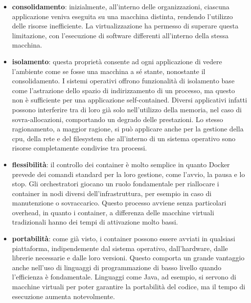 \begin{itemize}
	\item \textbf{consolidamento}: inizialmente, all'interno delle organizzazioni, ciascuna applicazione veniva eseguita su una macchina distinta, rendendo l'utilizzo delle risorse inefficiente. La virtualizzazione ha permesso di superare questa limitazione, con l'esecuzione di software differenti all'interno della stessa macchina.
	\item \textbf{isolamento}: questa proprietà consente ad ogni applicazione di vedere l'ambiente come se fosse una macchina a sé stante, nonostante il consolidamento. I sistemi operativi offrono funzionalità di isolamento base come l'astrazione dello spazio di indirizzamento di un processo, ma questo non è sufficiente per una applicazione self-contained. Diversi applicativi infatti possono interferire tra di loro già solo nell'utilizzo della memoria, nel caso di sovra-allocazioni, comportando un degrado delle prestazioni. Lo stesso ragionamento, a maggior ragione, si può applicare anche per la gestione della cpu, della rete e del filesystem che all'interno di un sistema operativo sono risorse completamente condivise tra processi. 
	\item \textbf{flessibilità}: il controllo dei container è molto semplice in quanto Docker prevede dei comandi standard per la loro gestione, come l'avvio, la pausa e lo stop. Gli orchestratori giocano un ruolo fondamentale per riallocare i container in nodi diversi dell'infrastruttura, per esempio in caso di manutenzione o sovraccarico. Questo processo avviene senza particolari overhead, in quanto i container, a differenza delle macchine virtuali tradizionali hanno dei tempi di attivazione molto bassi.
	\item \textbf{portabilità}: come già visto, i container possono essere avviati in qualsiasi piattaforma, indipendemente dal sistema operativo, dall'hardware, dalle librerie necessarie e dalle loro versioni. Questo comporta un grande vantaggio anche nell'uso di linguaggi di programmazione di basso livello quando l'efficienza è fondamentale. Linguaggi come Java, ad esempio, si servono di macchine virtuali per poter garantire la portabilità del codice, ma il tempo di esecuzione aumenta notevolmente. 
\end{itemize}


